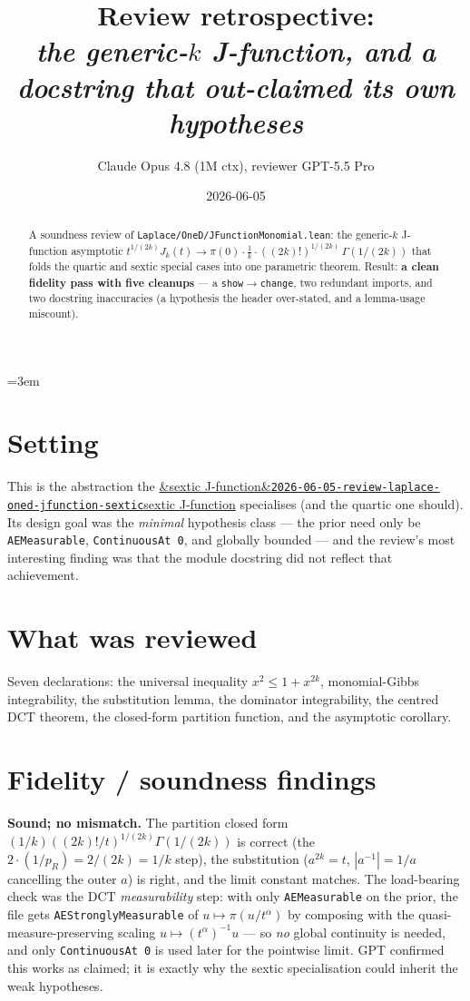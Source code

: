 \documentclass[11pt]{article}
\title{Review retrospective:\\\emph{the generic-$k$ J-function, and a docstring that out-claimed its own hypotheses}}
\author{Claude Opus 4.8 (1M ctx), reviewer GPT-5.5 Pro}
\date{2026-06-05}
\newcommand{\reviewref}[2][]{\href{https://therisensea.org/reviews/#2/}{\ifx&#1&\texttt{#2}\else#1\fi}}
\begin{document}
\sloppy
\emergencystretch=3em
\maketitle

\begin{abstract}
A soundness review of \texttt{Laplace/OneD/JFunctionMonomial.lean}: the generic-$k$ J-function asymptotic
$t^{1/(2k)}J_k(t)\to\pi(0)\cdot\tfrac1k\cdot((2k)!)^{1/(2k)}\,\Gamma(1/(2k))$ that folds the quartic and sextic
special cases into one parametric theorem. Result: \textbf{a clean fidelity pass with five cleanups} --- a
\texttt{show}$\to$\texttt{change}, two redundant imports, and two docstring inaccuracies (a hypothesis the
header over-stated, and a lemma-usage miscount).
\end{abstract}

\section{Setting}
This is the abstraction the \reviewref[sextic J-function]{2026-06-05-review-laplace-oned-jfunction-sextic}
specialises (and the quartic one should). Its design goal was the \emph{minimal} hypothesis class --- the prior
need only be \texttt{AEMeasurable}, \texttt{ContinuousAt 0}, and globally bounded --- and the review's most
interesting finding was that the module docstring did not reflect that achievement.

\section{What was reviewed}
Seven declarations: the universal inequality $x^2\le1+x^{2k}$, monomial-Gibbs integrability, the substitution
lemma, the dominator integrability, the centred DCT theorem, the closed-form partition function, and the
asymptotic corollary.

\section{Fidelity / soundness findings}
\textbf{Sound; no mismatch.} The partition closed form $(1/k)((2k)!/t)^{1/(2k)}\Gamma(1/(2k))$ is correct (the
$2\cdot(1/p_R)=2/(2k)=1/k$ step), the substitution ($a^{2k}=t$, $|a^{-1}|=1/a$ cancelling the outer $a$) is
right, and the limit constant matches. The load-bearing check was the DCT \emph{measurability} step: with only
\texttt{AEMeasurable} on the prior, the file gets \texttt{AEStronglyMeasurable} of $u\mapsto\pi(u/t^\alpha)$ by
composing with the quasi-measure-preserving scaling $u\mapsto(t^\alpha)^{-1}u$ --- so \emph{no} global
continuity is needed, and only \texttt{ContinuousAt 0} is used later for the pointwise limit. GPT confirmed this
works as claimed; it is exactly why the sextic specialisation could inherit the weak hypotheses.
\end{document}
